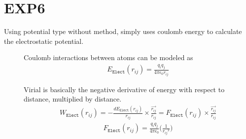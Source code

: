 \documentclass[letterpaper,10pt,english]{sphinxmanual}
\begin{document}
\section{EXP6}
\label{\detokenize{electrostatic:exp6}}
Using  potential type without  method, simply uses coulomb energy to calculate the electrostatic potential.
\begin{description}
\item[{}] \leavevmode
Coulomb interactions between atoms can be modeled as
\begin{equation*}
\begin{split}E_{\texttt{Elect}}(r_{ij}) = \frac{q_i q_j}{4\pi \epsilon_0 r_{ij}}\end{split}
\end{equation*}
\item[{}] \leavevmode
Virial is basically the negative derivative of energy with respect to distance, multiplied by distance.
\begin{equation*}
\begin{split}W_{\texttt{Elect}}(r_{ij}) = -\frac{dE_{\texttt{Elect}}(r_{ij})}{r_{ij}}\times \frac{\overrightarrow{r_{ij}}}{{r_{ij}}} = F_{\texttt{Elect}}(r_{ij}) \times \frac{\overrightarrow{r_{ij}}}{{r_{ij}}}\end{split}
\end{equation*}\begin{equation*}
\begin{split}F_{\texttt{Elect}}(r_{ij}) = \frac{q_i q_j}{4\pi \epsilon_0} \Big( \frac{1}{{r_{ij}}^2} \Big)\end{split}
\end{equation*}
\end{description}
\end{document}
